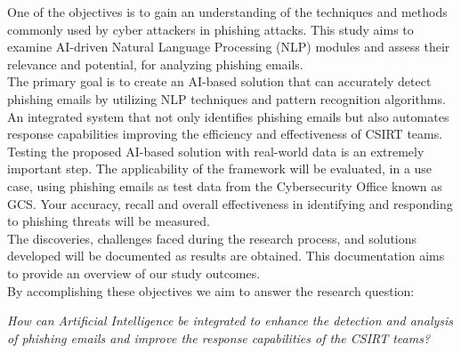 One of the objectives is to gain an understanding of the techniques and methods commonly used by cyber attackers in phishing attacks.
This study aims to examine AI-driven Natural Language Processing (NLP) modules and assess their relevance and potential, for analyzing phishing emails.\\
The primary goal is to create an AI-based solution that can accurately detect phishing emails by utilizing NLP techniques and pattern recognition algorithms. An integrated system that not only identifies phishing emails but also automates response capabilities improving the efficiency and effectiveness of CSIRT teams.\\
Testing the proposed AI-based solution with real-world data is an extremely important step. The applicability of the framework will be evaluated, in a use case, using phishing emails as test data from the Cybersecurity Office known as GCS. Your accuracy, recall and overall effectiveness in identifying and responding to phishing threats will be measured.\\
The discoveries, challenges faced during the research process, and solutions developed will be documented as results are obtained. This documentation aims to provide an overview of our study outcomes. \\
By accomplishing these objectives we aim to answer the research question:

\textit{How can Artificial Intelligence be integrated to enhance the detection and analysis of phishing emails and improve the response capabilities of the CSIRT teams?}


